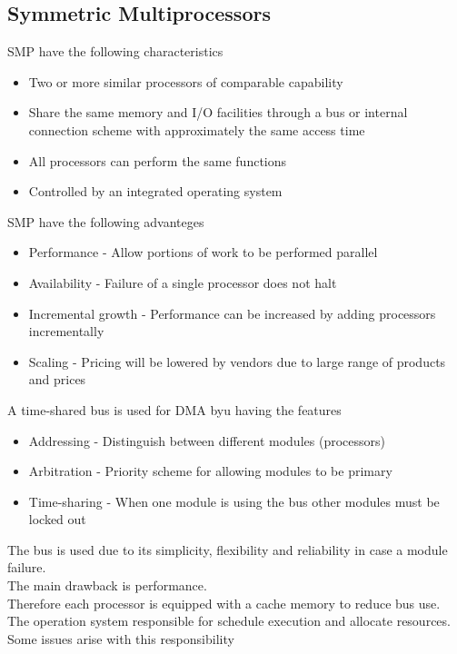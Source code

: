 \documentclass[12pt, a4paper]{article}
\begin{document}
		\subsection{Symmetric Multiprocessors}
			SMP have the following characteristics
			\begin{itemize}
				\item Two or more similar processors of comparable capability
				\item Share the same memory and I/O facilities through a bus or internal connection scheme with approximately the same access time
				\item All processors can perform the same functions
				\item Controlled by an integrated operating system
			\end{itemize}
			SMP have the following advanteges
			\begin{itemize}
				\item Performance - Allow portions of work to be performed parallel
				\item Availability - Failure of a single processor does not halt
				\item Incremental growth - Performance can be increased by adding processors incrementally
				\item Scaling - Pricing will be lowered by vendors due to large range of products and prices
			\end{itemize}
			A time-shared bus is used for DMA byu having the features
			\begin{itemize}
				\item Addressing - Distinguish between different modules (processors)
				\item Arbitration - Priority scheme for allowing modules to be primary
				\item Time-sharing - When one module is using the bus other modules must be locked out
			\end{itemize}
			The bus is used due to its simplicity, flexibility and reliability in case a module failure.\\
			The main drawback is performance.\\
			Therefore each processor is equipped with a cache memory to reduce bus use.\\
			The operation system responsible for schedule execution and allocate resources.\\
			Some issues arise with this responsibility
\end{document}
